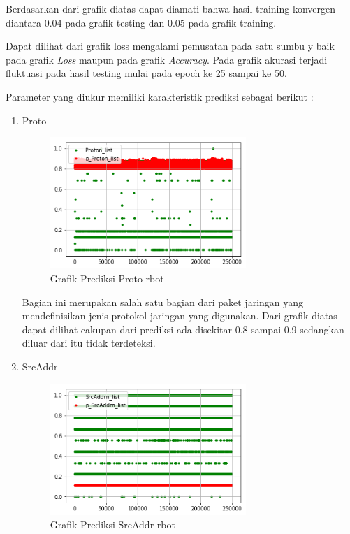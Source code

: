 \documentclass[./skripsi.tex]{subfiles}
\begin{document}
\par Berdasarkan dari grafik diatas dapat diamati bahwa hasil training konvergen diantara 0.04 pada grafik testing dan 0.05 pada grafik training.
\par Dapat dilihat dari grafik loss mengalami pemusatan pada satu sumbu y baik pada grafik \textit{Loss} maupun pada grafik \textit{Accuracy}. Pada grafik akurasi terjadi fluktuasi pada hasil testing mulai pada epoch ke 25 sampai ke 50.

\par Parameter yang diukur memiliki karakteristik prediksi sebagai berikut :
\begin{enumerate}
    \item Proto
    \begin{figure}%
        \centering
        \includegraphics[width=0.7\textwidth]{public/assets/img/lstmm_rbot_pred1.png}
        \caption{Grafik Prediksi Proto rbot}
        \label{fig:lstmm_rbot_pred1}
    \end{figure}
    
    \par Bagian ini merupakan salah satu bagian dari paket jaringan yang mendefinisikan jenis protokol jaringan yang digunakan. Dari grafik diatas dapat dilihat cakupan dari prediksi ada disekitar 0.8 sampai 0.9 sedangkan diluar dari itu tidak terdeteksi.
    
    \item SrcAddr \nobreak
    \begin{figure}%
        \centering
        \includegraphics[width=0.7\textwidth]{public/assets/img/lstmm_rbot_pred2.png}
        \caption{Grafik Prediksi SrcAddr rbot}
        \label{fig:lstmm_rbot_pred2}
    \end{figure}
    

\end{enumerate}
\end{document}
